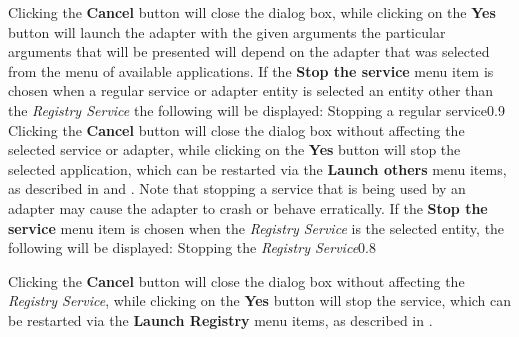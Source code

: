 Clicking the \textbf{Cancel} button will close the dialog box, while clicking on the
\textbf{Yes} button will launch the adapter with the given arguments \longDash{} the
particular arguments that will be presented will depend on the adapter that was selected
from the menu of available applications.
\secondaryEnd
{}
If the \textbf{Stop the service} menu item is chosen when a regular service or adapter
entity is selected \longDash{} an entity other than the \emph{Registry Service}
\longDash{} the following will be displayed:
%
{Stopping a regular service}{0.9}
\condPage{}
Clicking the \textbf{Cancel} button will close the dialog box without affecting the
selected service or adapter, while clicking on the \textbf{Yes} button will stop the
selected application, which can be restarted via the \textbf{Launch others \textellipsis}
menu items, as described in
 and
.
Note that stopping a service that is being used by an adapter may cause the adapter to
crash or behave erratically.
\secondaryEnd
{}
If the \textbf{Stop the service} menu item is chosen when the \emph{Registry Service} is
the selected entity, the following will be displayed:
%
{Stopping the \emph{Registry Service}}{0.8}

Clicking the \textbf{Cancel} button will close the dialog box without affecting the
\emph{Registry Service}, while clicking on the \textbf{Yes} button will stop the service,
which can be restarted via the \textbf{Launch Registry} menu items, as described in
.
\secondaryEnd
\primaryEnd{}